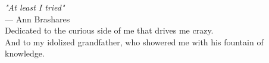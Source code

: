 
\thispagestyle{empty} %
\begin{center}
    \vspace*{\fill} %
    \textit{"At least I tried"}\\[0.5cm]
    --- Ann Brashares\\[3cm]

    Dedicated to the curious side of me that drives me crazy.\\[0.5cm]
    And to my idolized grandfather, who showered me with his fountain of knowledge.
    \vspace*{\fill}
\end{center}
